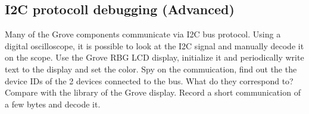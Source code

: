 \subsection{I2C protocoll debugging (Advanced)}
Many of the Grove components communicate via I2C bus protocol. Using a digital oscilloscope, it is possible to look at the I2C signal and manually decode it on the scope. Use the Grove RBG LCD display, initialize it and periodically write text to the display and set the color. Spy on the commuication, find out the the device IDs of the 2 devices connected to the bus. What do they correspond to? Compare with the library of the Grove display. Record a short communication of a few bytes and decode it.















